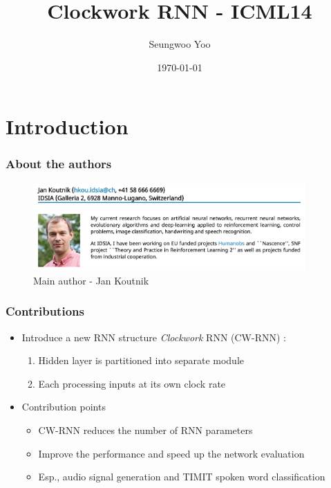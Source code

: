 \documentclass{beamer}
\title{Clockwork RNN - ICML14}
\author{Seungwoo Yoo}
\date{\today}
\begin{document}
\frame{\titlepage}

\section[Outline]{}
\frame{\tableofcontents}

\section{Introduction}
\frame
{
	\frametitle{About the authors}
    \begin{figure}[ht]  
		\begin{center}
			\includegraphics[width=4.1in]{Images/author.png}   
		\end{center}   
		\caption{Main author - Jan Koutnik}
	\end{figure}
}
\frame
{
	\frametitle{Contributions}
	\begin{itemize}
        \item Introduce a new RNN structure \textit{Clockwork} RNN (CW-RNN) :
			\begin{enumerate}
			\item Hidden layer is partitioned into separate module
			\item Each processing inputs at its own clock rate
			\end{enumerate}
		\item Contribution points
			\begin{itemize}
			\item CW-RNN reduces the number of RNN parameters
			\item Improve the performance and speed up the network evaluation
            \item Esp., audio signal generation and TIMIT spoken word classification
			\end{itemize}
	\end{itemize}
}
\end{document}
